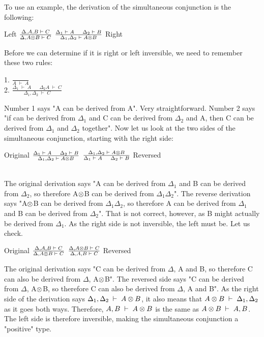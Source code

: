 To use an example, the derivation of the simultaneous conjunction is the following:
\begin{texto}
	Left $\frac{\Delta , A, B \;\vdash\; C}{\Delta , A \otimes B \;\vdash\; C}$ \hspace{50pt}
	$\frac{\Delta_1 \;\vdash\; A \hspace{12pt} \Delta_2 \;\vdash\; B}{\Delta_1 , \Delta_2 \;\vdash\; A \otimes B}$ Right
\end{texto}
Before we can determine if it is right or left inversible, we need to remember these two rules:
\begin{texto}
	1. $\frac{ }{A \;\vdash\; A}$\\ \vspace{5pt}
	2. $\frac{\Delta_1 \;\vdash\; A \hspace{20pt} \Delta_2 A \;\vdash\; C}{\Delta_1 , \Delta_2 \;\vdash\; C}$ \hspace{30pt}
\end{texto}
Number 1 says "A can be derived from A". Very straightforward. Number 2 says "if can be derived from $\Delta_1$ and C can be derived from $\Delta_2$ and A, then C can be derived from $\Delta_1$ and $\Delta_2$ together". Now let us look at the two sides of the simultaneous conjunction, starting with the right side:
\begin{texto}
	Original $\frac{\Delta_1 \;\vdash\; A \hspace{12pt} \Delta_2 \;\vdash\; B}{\Delta_1 , \Delta_2 \;\vdash\; A \otimes B}$ \hspace{50pt}
	$\frac{\Delta_1 , \Delta_2 \;\vdash\; A \otimes B}{\Delta_1 \;\vdash\; A \hspace{12pt} \Delta_2 \;\vdash\; B}$ Reversed
\end{texto}
\\
The original derivation says "A can be derived from $\Delta_1$ and B can be derived from $\Delta_2$, so therefore A$\otimes$B can be derived from $\Delta_1$$\Delta_2$". The reverse derivation says "A$\otimes$B can be derived from $\Delta_1$$\Delta_2$, so therefore A can be derived from $\Delta_1$ and B can be derived from $\Delta_2$". That is not correct, however, as B might actually be derived from $\Delta_1$. As the right side is not inversible, the left must be. Let us check.
\begin{texto}
	Original $\frac{\Delta , A, B \;\vdash\; C}{\Delta , A \otimes B \;\vdash\; C}$ \hspace{50pt}
	$\frac{\Delta , A \otimes B \;\vdash\; C}{\Delta , A, B \;\vdash\; C}$ Reversed
\end{texto}
The original derivation says "C can be derived from $\Delta$, A and B, so therefore C can also be derived from $\Delta$, A$\otimes$B". The reversed side says "C can be derived from $\Delta$, A$\otimes$B, so therefore C can also be derived from $\Delta$, A and B". As the right side of the derivation says $\Delta_1 , \Delta_2 \;\vdash\; A \otimes B$, it also means that $A \otimes B \;\vdash\; \Delta_1 , \Delta_2$ as it goes both ways. Therefore, $A , B \;\vdash\; A \otimes B$ is the same as $A \otimes B \;\vdash\; A , B$. The left side is therefore inversible, making the simultaneous conjunction a "positive" type.

